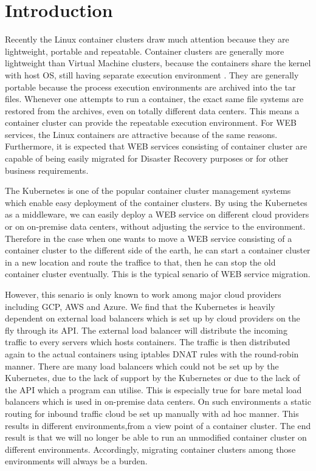 \section{Introduction}

Recently the Linux container clusters draw much attention because they are lightweight, portable and repeatable.
Container clusters are generally more lightweight than Virtual Machine clusters, 
because the containers share the kernel with host OS, still having separate execution environment . 
They are generally portable because the process execution environments are archived into the tar files.
Whenever one attempts to run a container, the exact same file systems are restored from the archives, 
even on totally different data centers. 
This means a container cluster can provide the repeatable execution environment.
For WEB services, the Linux containers are attractive because of the same reasons. 
Furthermore, it is expected that WEB services consisting of container cluster are 
capable of being easily migrated for Disaster Recovery purposes or for other business requirements.

The Kubernetes\cite{K8s2017} is one of the popular container cluster management systems
which enable easy deployment of the container clusters.
By using the Kubernetes as a middleware, we can easily deploy a WEB service on different 
cloud providers or on on-premise data centers, without adjusting the service to the environment.
Therefore in the case when one wants to move a WEB service consisting of a container cluster 
to the different side of the earth, he can start a container cluster in a new location and 
route the traffice to that, then he can stop the old container cluster eventually.
This is the typical senario of WEB service migration.

However, this senario is only known to work among major cloud providers including GCP, AWS and Azure.
We find that the Kubernetes is heavily dependent on external load balancers 
which is set up by cloud providers on the fly through its API. 
The external load balancer will distribute the incoming traffic to every servers which hosts containers.
The traffic is then distributed again to the actual containers using iptables DNAT\cite{MartinA.Brown2017,Marmol2015} 
rules with the round-robin manner. 
There are many load balancers which could not be set up by the Kubernetes, 
due to the lack of support by the Kubernetes or due to the lack of the API which a program can utilise.
This is especially true for bare metal load balancers which is used in on-premise data centers.
On such environments a static routing for inbound traffic cloud be set up manually with ad hoc manner.
This results in different environments,from a view point of a container cluster.
The end result is that we will no longer be able to run an unmodified container cluster on different environments.
Accordingly, migrating container clusters among those environments will always be a burden.

